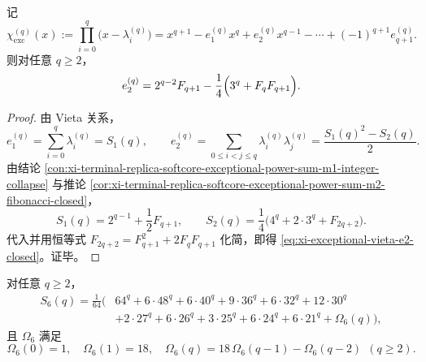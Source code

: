 \begin{conclusion}\label{con:xi-terminal-replica-softcore-exceptional-vieta-e2-closed-form}
记
\[
\chi_{\mathrm{exc}}^{(q)}(x)
:=\prod_{i=0}^{q}\bigl(x-\lambda_i^{(q)}\bigr)
=x^{q+1}-e_1^{(q)}x^q+e_2^{(q)}x^{q-1}-\cdots+(-1)^{q+1}e_{q+1}^{(q)}.
\]
则对任意 \(q\ge 2\)，
\begin{equation}\label{eq:xi-exceptional-vieta-e2-closed}
e_2^{(q)}
=2^{q-2}F_{q+1}
-\frac14\Bigl(3^q+F_qF_{q+1}\Bigr).
\end{equation}
\end{conclusion}

\begin{proof}
由 Vieta 关系，
\[
e_1^{(q)}=\sum_{i=0}^{q}\lambda_i^{(q)}=S_1(q),\qquad
e_2^{(q)}=\sum_{0\le i<j\le q}\lambda_i^{(q)}\lambda_j^{(q)}
=\frac{S_1(q)^2-S_2(q)}{2}.
\]
由结论
\ref{con:xi-terminal-replica-softcore-exceptional-power-sum-m1-integer-collapse}
与推论 \ref{cor:xi-terminal-replica-softcore-exceptional-power-sum-m2-fibonacci-closed}，
\[
S_1(q)=2^{q-1}+\frac12F_{q+1},\qquad
S_2(q)=\frac14\bigl(4^q+2\cdot 3^q+F_{2q+2}\bigr).
\]
代入并用恒等式
\(
F_{2q+2}=F_{q+1}^2+2F_qF_{q+1}
\)
化简，即得 \eqref{eq:xi-exceptional-vieta-e2-closed}。证毕。
\end{proof}

\begin{conclusion}\label{con:xi-terminal-replica-softcore-exceptional-power-sum-m6-fibonacci-component-spectrum}
对任意 \(q\ge 2\)，
\begin{equation}\label{eq:xi-exceptional-s6-fibonacci-spectrum-closed}
\begin{aligned}
S_6(q)=\frac1{64}\Big(
&64^q+6\cdot48^q+6\cdot40^q+9\cdot36^q+6\cdot32^q+12\cdot30^q\\
&+2\cdot27^q+6\cdot26^q+3\cdot25^q+6\cdot24^q+6\cdot21^q+\Omega_6(q)
\Big),
\end{aligned}
\end{equation}
且 \(\Omega_6\) 满足
\begin{equation}\label{eq:xi-omega6-second-order-recurrence}
\Omega_6(0)=1,\quad
\Omega_6(1)=18,\quad
\Omega_6(q)=18\,\Omega_6(q-1)-\Omega_6(q-2)\ \ (q\ge 2).
\end{equation}
\end{conclusion}

